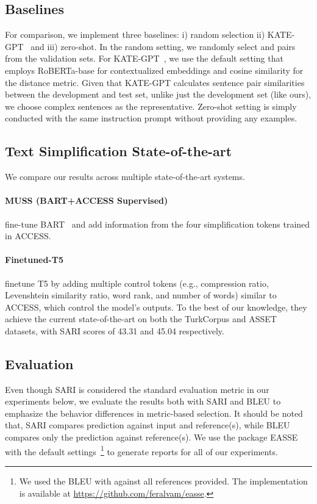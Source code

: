 \documentclass[11pt]{article}
\begin{document}
\subsection{Baselines}

    For comparison, we implement three baselines: i) random selection ii) KATE-GPT~\citep{kategpt} and iii) zero-shot. In the random setting, we randomly select  and  pairs from the validation sets. For KATE-GPT~\citep{kategpt}, we use the default setting that employs RoBERTa-base for contextualized embeddings and cosine similarity for the distance metric. Given that KATE-GPT calculates sentence pair similarities between the development and test set, unlike just the development set (like ours), we choose complex sentences as the representative. Zero-shot setting is simply conducted with the same instruction prompt without providing any examples.

    
\subsection{Text Simplification State-of-the-art}
\label{ssec:sota}
    We compare our results across multiple state-of-the-art systems.
    
    \paragraph{MUSS (BART+ACCESS Supervised)} \citet{martin-etal-2022-muss} fine-tune BART~\citep{bart} and add information from the four simplification tokens trained in ACCESS. 
    
    \paragraph{Finetuned-T5} \citet{sheang-saggion-2021-controllable} finetune T5 by adding multiple control tokens (e.g., compression ratio, Levenshtein similarity ratio, word rank, and number of words) similar to ACCESS, which control the model's outputs. To the best of our knowledge, they achieve the current state-of-the-art on both the TurkCorpus and ASSET datasets, with SARI scores of 43.31 and 45.04 respectively.

\subsection{Evaluation}
Even though SARI is considered the standard evaluation metric in our experiments below, we evaluate the results both with SARI and BLEU to emphasize the behavior differences in metric-based selection. It should be noted that, SARI compares prediction against input and reference(s), while BLEU compares only the prediction against reference(s). We use the package EASSE~\citep{alva-manchego-etal-2019-easse} with the default settings~\footnote{We used the BLEU with  against all references provided. The implementation is available at \url{https://github.com/feralvam/easse}.} to generate reports for all of our experiments. 
\end{document}
